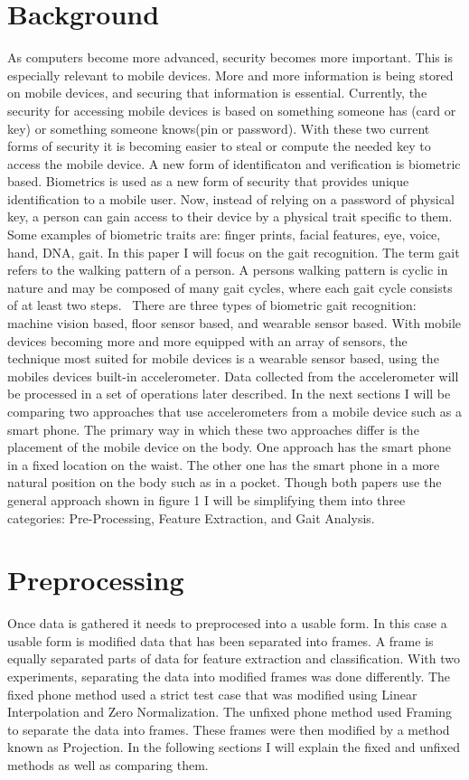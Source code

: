 \documentclass{sig-alternate}
\begin{document}
\section{Background}
	As computers become more advanced, security becomes more important. This is especially relevant to mobile devices. More and more information is being stored on mobile devices, and securing that information is essential. Currently, the security for accessing mobile devices is based on something someone has (card or key) or something someone knows(pin or password). With these two current forms of security it is becoming easier to steal or compute the needed key to access the mobile device. 
		A new form of identificaton and verification is biometric based. Biometrics is used as a new form of security that provides unique identification to a mobile user. Now, instead of relying on a password of physical key, a person can gain access to their device by a physical trait specific to them. Some examples of biometric traits are: finger prints, facial features, eye, voice, hand, DNA, gait. In this paper I will focus on the gait recognition. The term gait refers to the walking pattern of a person. A persons walking pattern is cyclic in nature and may be composed of many gait cycles, where each gait cycle consists of at least two steps.~\cite{Sujithra:2012} 
			There are three types of biometric gait recognition: machine vision based, floor sensor based, and wearable sensor based. With mobile devices becoming more and more equipped with an array of sensors, the technique most suited for mobile devices is a wearable sensor based, using the mobiles devices built-in accelerometer. Data collected from the accelerometer will be processed in a set of operations later described. 
	In the next sections I will be comparing two approaches that use accelerometers from a mobile device such as a smart phone. The primary way in which these two approaches differ is the placement of the mobile device on the body. One approach has the smart phone in a fixed location on the waist. The other one has the smart phone in a more natural position on the body such as in a pocket. Though both papers use the general approach shown in figure 1 I will be simplifying them into three categories: Pre-Processing, Feature Extraction, and Gait Analysis. 
\section{Preprocessing} 
Once data is gathered it needs to preprocesed into a usable form. In this case a usable form is modified data that has been separated into frames. A frame is equally separated parts of data for feature extraction and classification. With two experiments, separating the data into modified frames was done differently. The fixed phone method used a strict test case that was modified using Linear Interpolation and Zero Normalization. The unfixed phone method used Framing to separate the data into frames. These frames were then modified by a method known as Projection. In the following sections I will explain the fixed and unfixed methods as well as comparing them. 
\end{document}
